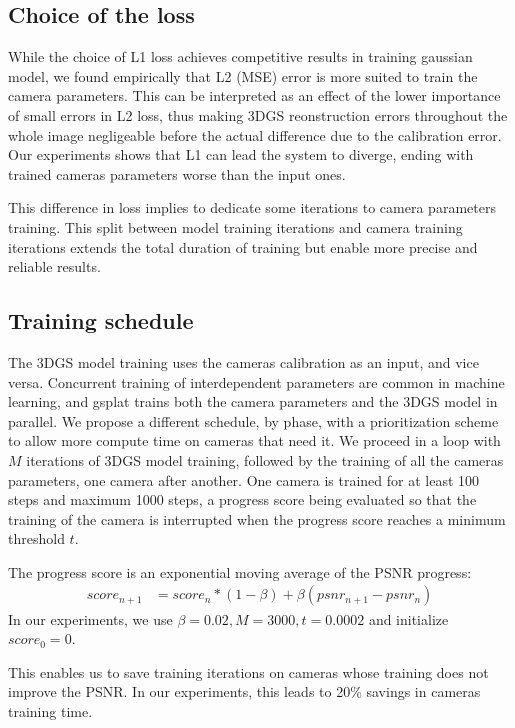 \documentclass{article}
\begin{document}
\subsection{Choice of the loss} \label{L2}
While the choice of L1 loss achieves competitive results in training gaussian model, we found empirically that L2 (MSE) error is more
suited to train the camera parameters. This can be interpreted as an effect of the lower importance of small
errors in L2 loss, thus making 3DGS reonstruction errors throughout the whole image negligeable before the actual
difference due to the calibration error.
Our experiments shows that L1 can lead the system to diverge, ending with trained cameras parameters worse than
the input ones.

This difference in loss implies to dedicate some iterations to camera parameters training. This split between
model training iterations and camera training iterations extends the total duration of training but enable
more precise and reliable results.

\subsection{Training schedule} \label{schedule}
The 3DGS model training uses the cameras calibration as an input, and vice versa. Concurrent training of interdependent
parameters are common in machine learning, and gsplat \cite{ye2024gsplat} trains both the camera parameters and the 3DGS
model in parallel.
We propose a different schedule, by phase, with a prioritization scheme to allow more compute time on cameras that need it.
We proceed in a loop with $M$ iterations of 3DGS model training, followed by the training of all the cameras parameters, one camera
after another. One camera is trained for at least 100 steps and maximum 1000 steps, a progress score being evaluated so that the training of the
camera is interrupted when the progress score reaches a minimum threshold $t$.

The progress score is an exponential moving average of the PSNR progress:
\begin{align}
	score_{n+1} &= score_n * (1 - \beta) + \beta (psnr_{n+1} - psnr_n) 
\end{align}
In our experiments, we use $\beta = 0.02, M = 3000, t = 0.0002$ and initialize $score_0 = 0$.

This enables us to save training iterations on cameras whose training does not improve the PSNR. In our 
experiments, this leads to 20\% savings in cameras training time.
\end{document}
